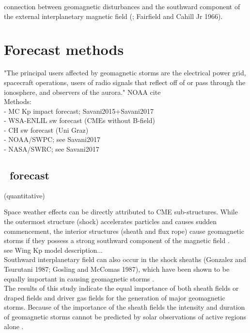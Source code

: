 connection between geomagnetic disturbances and the southward component of the external interplanetary magnetic field (\citep{Dungey1961}; Fairfield and Cahill Jr 1966).\\


\section{Forecast methods}
"The principal users affected by geomagnetic storms are the electrical power grid, spacecraft operations, users of radio signals that reflect off of or pass through the ionosphere, and observers of the aurora." NOAA cite\\


Methods:\\
- MC Kp impact forecast; Savani2015+Savani2017\\
- WSA-ENLIL sw forecast (CMEs without B-field)\\
- CH sw forecast (Uni Graz)\\
- NOAA/SWPC; see Savani2017\\
- NASA/SWRC; see Savani2017\\

\subsection{\Kp~forecast} (quantitative)

Space weather effects can be directly attributed to CME sub-structures. While the outermost structure (shock) accelerates particles and causes sudden commencement, the interior structures (sheath and flux rope) cause geomagnetic storms if they possess a strong southward component of the magnetic field \citep{Gopalswamy2016}.\\

see Wing Kp model description...\\

Southward interplanetary field can also occur in the shock sheaths (Gonzalez and Tsurutani 1987; Gosling and McComas 1987), which have been shown to be equally important in causing geomagnetic storms \citep{Tsurutani1988}.\\
The results of this study indicate the equal importance of both sheath fields or draped fields and driver gas fields for the generation of major geomagnetic storms. Because of the importance of the sheath fields the intensity and duration of geomagnetic storms cannot be predicted by solar observations of active regions alone \citep{Tsurutani1988}.\\

